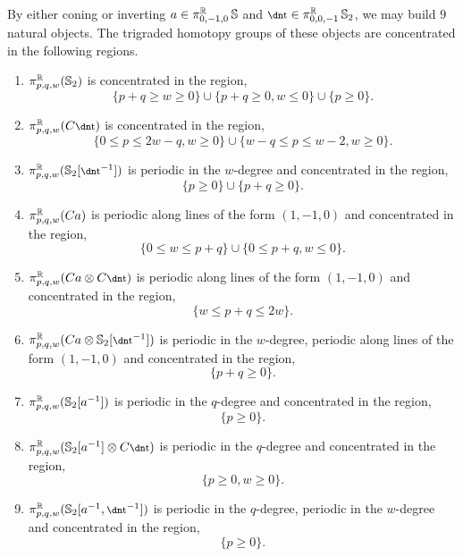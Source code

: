 \begin{thm}\label{thm:omnibus-vanishing}
  By either coning or inverting $a \in \pi_{0,-1,0}^{\mathbb{R}} \operatorname{\mathbb{S}}$ and $\ta \in \pi_{0,0,-1}^{\R} \Ss_2$, we may build $9$ natural objects. The trigraded homotopy groups of these objects are concentrated in the following regions.
  \begin{enumerate}
  \item $\pi_{p,q,w}^{\mathbb{R}} (\operatorname{\mathbb{S}}_2)$
    is concentrated in the region,
    \[ \{ p+q \geq w \geq 0 \} \cup \{p+q \geq 0, w \leq 0\} \cup \{ p \geq 0 \}. \]

  \item $\pi_{p,q,w}^\R (C\ta)$
    is concentrated in the region,
    \[ \{ 0 \leq p \leq 2w-q, w \geq 0 \} \cup \{ w-q \leq p \leq w-2, w \geq 0 \}. \]

  \item $\pi_{p,q,w}^\R (\Ss_2[\ta^{-1}])$
    is periodic in the $w$-degree and concentrated in the region,
    \[ \{ p \geq 0 \} \cup \{ p+q \geq 0 \}. \]

  \item $\pi_{p,q,w}^{\mathbb{R}} (Ca)$
    is periodic along lines of the form $(1,-1,0)$ and concentrated in the region,
    \[ \{ 0 \leq w \leq p+q \} \cup \{ 0 \leq p+q, w \leq 0 \}. \]
    
  \item $\pi_{p,q,w}^\R (Ca \otimes C\ta)$
    is periodic along lines of the form $(1,-1,0)$ and concentrated in the region,
    \[ \{ w \leq p+q \leq 2w \}. \]
    
  \item $\pi_{p,q,w}^\R (Ca \otimes \Ss_2[\ta^{-1}])$
    is periodic in the $w$-degree, periodic along lines of the form $(1,-1,0)$ and concentrated in the region,
    \[ \{p+q \geq 0\}. \]
    
  \item $\pi_{p,q,w}^{\mathbb{R}} (\operatorname{\mathbb{S}}_2 [a^{-1}])$
    is periodic in the $q$-degree and concentrated in the region,
    \[ \{ p \geq 0 \}. \] 

  \item $\pi_{p,q,w}^\R (\Ss_2 [a^{-1}] \otimes C\ta)$
    is periodic in the $q$-degree and concentrated in the region,
    \[ \{ p \geq 0, w \geq 0\}. \]
    
  \item $\pi_{p,q,w}^\R (\Ss_2 [a^{-1}, \ta^{-1}])$
    is periodic in the $q$-degree, periodic in the $w$-degree and concentrated in the region,
    \[ \{ p \geq 0 \}. \]

  \end{enumerate}
\end{thm}

